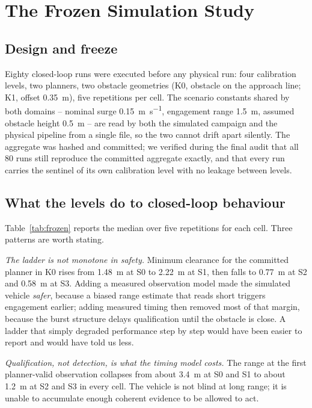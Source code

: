\section{The Frozen Simulation Study \frozenmark}
\label{sec:frozen}

\subsection{Design and freeze}

Eighty closed-loop runs were executed before any physical run: four
calibration levels, two planners, two obstacle geometries
(\textsf{K0}, obstacle on the approach line; \textsf{K1}, offset
\SI{0.35}{\metre}), five repetitions per cell. The scenario constants
shared by both domains -- nominal surge \SI{0.15}{\metre\per\second},
engagement range \SI{1.5}{\metre}, assumed obstacle height
\SI{0.5}{\metre} -- are read by both the simulated campaign and the
physical pipeline from a single file, so the two cannot drift apart
silently. The aggregate was hashed and committed; we verified during the
final audit that all 80 runs still reproduce the committed aggregate
exactly, and that every run carries the sentinel of its own calibration
level with no leakage between levels.

\subsection{What the levels do to closed-loop behaviour}

Table~\ref{tab:frozen} reports the median over five repetitions for each
cell. Three patterns are worth stating.

\emph{The ladder is not monotone in safety.} Minimum clearance for the
committed planner in \textsf{K0} rises from \SI{1.48}{\metre} at S0 to
\SI{2.22}{\metre} at S1, then falls to \SI{0.77}{\metre} at S2 and
\SI{0.58}{\metre} at S3. Adding a measured observation model made the
simulated vehicle \emph{safer}, because a biased range estimate that
reads short triggers engagement earlier; adding measured timing then
removed most of that margin, because the burst structure delays
qualification until the obstacle is close. A ladder that simply
degraded performance step by step would have been easier to report and
would have told us less.

\emph{Qualification, not detection, is what the timing model costs.} The
range at the first planner-valid observation collapses from about
\SI{3.4}{\metre} at S0 and S1 to about \SI{1.2}{\metre} at S2 and S3 in
every cell. The vehicle is not blind at long range; it is unable to
accumulate enough coherent evidence to be allowed to act.

